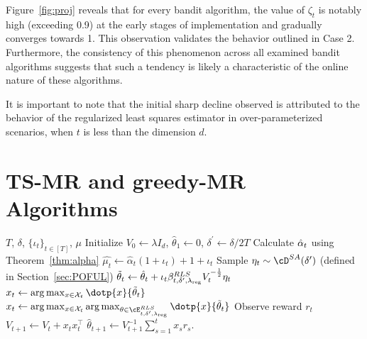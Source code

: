Figure~\ref{fig:proj} reveals that for every bandit algorithm, the value of $\zeta_t$ is notably high (exceeding 0.9) at the early stages of implementation and gradually converges towards 1. This observation validates the behavior outlined in Case 2. Furthermore, the consistency of this phenomenon across all examined bandit algorithms suggests that such a tendency is likely a characteristic of the online nature of these algorithms.

It is important to note that the initial sharp decline observed is attributed to the behavior of the regularized least squares estimator in over-parameterized scenarios, when $t$ is less than the dimension $d$.

\newpage
\section{TS-MR and greedy-MR Algorithms}
\label{sec:TS-MR}
\begin{algorithm}[!htp]
	\caption{TS-MR (Greedy-MR)}\label{alg:TS-MR}
	\begin{algorithmic}
		\REQUIRE $T$, $\delta$,  $\{\iota_t\}_{t\in [T]}$, $\mu$	
		\STATE Initialize $ V_{0} \leftarrow \lambda I_d$,  $\hat{\theta}_{1} \leftarrow 0$, $\delta^\prime \leftarrow \delta/2T$
		\STATE Calculate $\hat{\alpha}_t$ using Theorem~\ref{thm:alpha}
		\STATE $\hat{\mu_t} \leftarrow  \hat{\alpha}_t(1+\iota_t )+1+\iota_t$ 
		\STATE Sample $\eta_t\sim \cD^{SA}(\delta^\prime)$ (defined in Section~\ref{sec:POFUL})
		\STATE $\tilde{\theta}_{t}  \leftarrow \hat{\theta}_t +\iota_t \beta_{t,\delta^\prime, \lambda_{\text{reg}}}^{RLS} V_t^{-\frac{1}{2}} \eta_t$
		\STATE ${x}_{t} \leftarrow \arg \max _{x \in \mathcal{X}_t}\dotp{ x}{ \tilde{\theta}_{t}}$
		\ELSE
		\STATE   ${x}_{t} \leftarrow \arg \max _{x \in \mathcal{X}_t} \arg \max _{\theta \in \cE_{t,\delta^\prime, \lambdareg}^{RLS} }\dotp{ x}{ \tilde{\theta}_{t}}$
		\ENDIF
		\STATE Observe reward $r_{t}$
		\STATE $V_{t+1} \leftarrow V_{t}+{x}_{t}  {x}_{t}^{\top}$
		\STATE $\hat{\theta}_{t+1} \leftarrow V_{t+1}^{-1}\sum_{s=1}^{t} x_s r_{s}$.
		\ENDFOR
	\end{algorithmic}
\end{algorithm}






